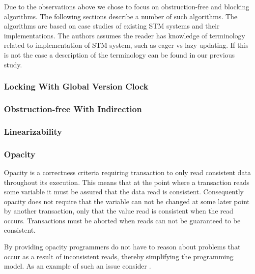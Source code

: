 Due to the observations above we chose to focus on obstruction-free and blocking algorithms. The following sections describe a number of such algorithms. The algorithms are based on case studies of existing \ac{STM} systems and their implementations. The authors assumes the reader has knowledge of terminology related to implementation of \ac{STM} system, such as eager vs lazy updating. If this is not the case a description of the terminology can be found in our previous study\cite[p. 53]{dpt907e14trending}.

\subsubsection{Locking With Global Version Clock}
\subsubsection{Obstruction-free With Indirection}
\subsubsection{Linearizability}
\subsubsection{Opacity}
Opacity is a correctness criteria requiring transaction to only read consistent data throughout its execution\cite[p. 1]{guerraoui2007opacity}\cite[p. 29]{harris2010transactional}. This means that at the point where a transaction reads some variable it must be assured that the data read is consistent. Consequently opacity does not require that the variable can not be changed at some later point by another transaction, only that the value read is consistent when the read occurs. Transactions must be aborted when reads can not be guaranteed to be consistent.

By providing opacity programmers do not have to reason about problems that occur as a result of inconsistent reads\cite[p. 28]{harris2010transactional}, thereby simplifying the programming model. As an example of such an issue consider .

